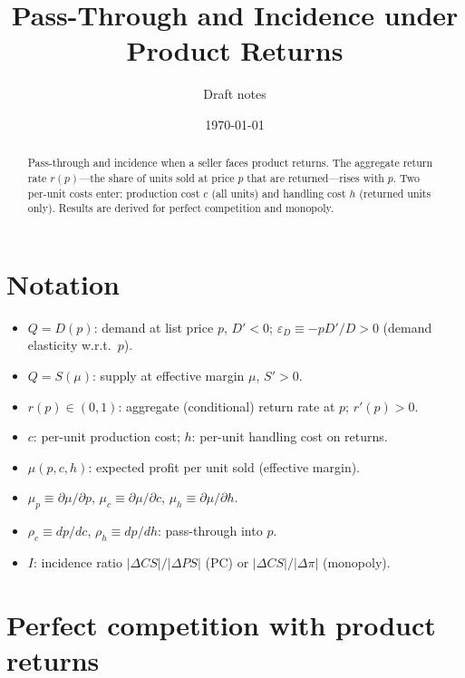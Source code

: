 \documentclass[11pt]{article}
\title{Pass-Through and Incidence under Product Returns}
\author{Draft notes}
\date{\today}
\begin{document}
\maketitle

\begin{abstract}
Pass-through and incidence when a seller faces product returns.  The aggregate
return rate $r(p)$---the share of units sold at price $p$ that are
returned---rises with $p$.  Two per-unit costs enter: production cost $c$ (all
units) and handling cost $h$ (returned units only).  Results are derived for
perfect competition and monopoly.
\end{abstract}

\section{Notation}
\label{sec:notation}

\begin{itemize}
  \item $Q=D(p)$: demand at list price $p$, $D'<0$;
    $\varepsilon_D\equiv -pD'/D>0$ (demand elasticity w.r.t.\ $p$).
  \item $Q=S(\mu)$: supply at effective margin $\mu$, $S'>0$.
  \item $r(p)\in(0,1)$: aggregate (conditional) return rate at $p$; $r'(p)>0$.
  \item $c$: per-unit production cost; $h$: per-unit handling cost on returns.
  \item $\mu(p,c,h)$: expected profit per unit sold (effective margin).
  \item $\mu_p\equiv\partial\mu/\partial p$,
    $\mu_c\equiv\partial\mu/\partial c$,
    $\mu_h\equiv\partial\mu/\partial h$.
  \item $\rho_c\equiv dp/dc$, $\rho_h\equiv dp/dh$: pass-through into $p$.
  \item $I$: incidence ratio $|\Delta CS|/|\Delta PS|$ (PC) or
    $|\Delta CS|/|\Delta\pi|$ (monopoly).
\end{itemize}

\section{Perfect competition with product returns}
\label{sec:pc-returns}
\end{document}
